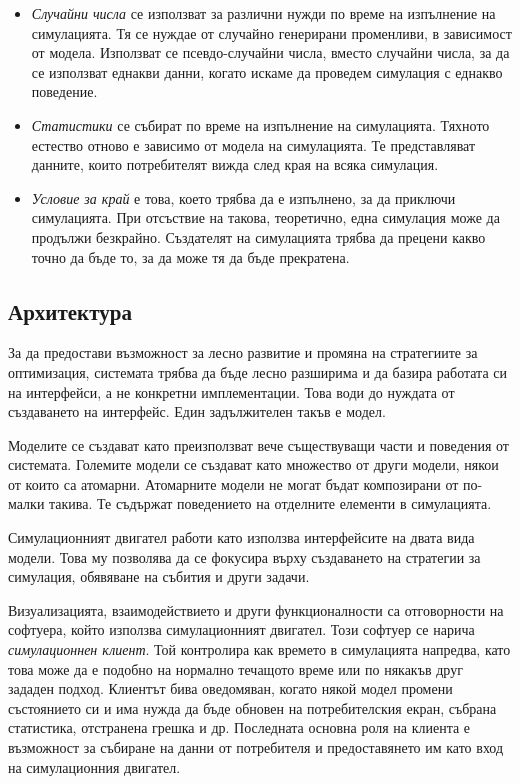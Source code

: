 \begin{itemize}
				\item \emph{Случайни числа} се използват за различни нужди по време на изпълнение на симулацията.
				Тя се нуждае от случайно генерирани променливи, в зависимост от модела. 
				Използват се псевдо-случайни числа, вместо случайни числа, за да се използват
				еднакви данни, когато искаме да проведем симулация с еднакво поведение.				
				
				\item \emph{Статистики} се събират по време на изпълнение на симулацията. Тяхното естество отново е зависимо от модела
				на симулацията. Те представляват данните, които потребителят вижда след края на всяка симулация.				
				
				\item \emph{Условие за край} е това, което трябва да е изпълнено, за да приключи симулацията. 
				При отсъствие на такова, теоретично, една симулация може да продължи безкрайно.
				Създателят на симулацията трябва да прецени какво точно да бъде то, 
				за да може тя да бъде прекратена.
				
			\end{itemize}
			
	\subsection{Архитектура}
		\label{sec:architecture}
		
		За да предостави възможност за лесно развитие и промяна на стратегиите за оптимизация, системата
		трябва да бъде лесно разширима и да базира работата си на интерфейси, а не конкретни имплементации.
		Това води до нуждата от създаването на интерфейс. Един задължителен такъв е модел. 
		
		Моделите се създават като преизползват вече съществуващи части и поведения от системата. 
		Големите модели се създават като множество от други модели, някои от които са атомарни.
		Атомарните модели не могат бъдат композирани от по-малки такива. Те съдържат поведението
		на отделните елементи в симулацията.
		
		Симулационният двигател работи като използва интерфейсите на двата вида модели. Това му позволява
		да се фокусира върху създаването на стратегии за симулация, обявяване на събития и други задачи.
		
		Визуализацията, взаимодействието и други функционалности са отговорности на софтуера, който използва 
		симулационният двигател. Този софтуер се нарича \emph{симулационнен клиент}. Той контролира
		как времето в симулацията напредва, като това може да е подобно на нормално течащото време или
		по някакъв друг зададен подход. Клиентът бива оведомяван, когато някой модел промени състоянието си
		и има нужда да бъде обновен на потребителския екран, събрана статистика, отстранена грешка и др.
		Последната основна роля на клиента е възможност за събиране на данни от потребителя и предоставянето
		им като вход на симулационния двигател.
		
